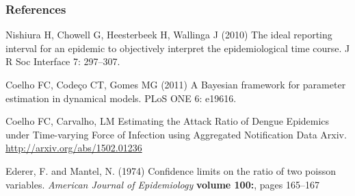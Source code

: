 \documentclass[10pt,compress,notheorems]{beamer}
\begin{document}
\begin{frame}[fragile]
\frametitle{References}
\begin{thebibliography}{10}
Nishiura H, Chowell G, Heesterbeek H, Wallinga J (2010) {{T}he ideal reporting
  interval for an epidemic to objectively interpret the epidemiological time
  course}.
\newblock J R Soc Interface 7: 297--307.

Coelho FC, Code\c{c}o CT, Gomes MG (2011) {A} {B}ayesian framework for
  parameter estimation in dynamical models.
\newblock PLoS ONE 6: e19616.

Coelho FC, Carvalho, LM {E}stimating the Attack Ratio of Dengue 
Epidemics under Time-varying Force of Infection using Aggregated Notification 
Data
\newblock Arxiv. \url{http://arxiv.org/abs/1502.01236}

Ederer, F. and Mantel, N. (1974)
\newblock Confidence limits on the ratio of two poisson
  variables.
\newblock \emph{American Journal of Epidemiology}
  \textbf{volume 100:}, pages 165--167

\end{thebibliography}

\end{frame}
\end{document}
